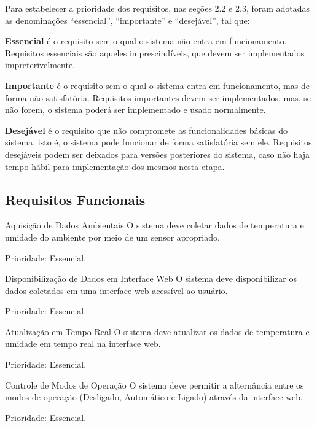 Para estabelecer a prioridade dos requisitos, nas seções 2.2 e 2.3, foram adotadas as
denominações “essencial”, “importante” e “desejável”, tal que:

\textbf{Essencial} é o requisito sem o qual o sistema não entra em funcionamento. Requisitos
essenciais são aqueles imprescindíveis, que devem ser implementados impreterivelmente.

\textbf{Importante} é o requisito sem o qual o sistema entra em funcionamento, mas de forma não
satisfatória. Requisitos importantes devem ser implementados, mas, se não forem, o sistema
poderá ser implementado e usado normalmente.

\textbf{Desejável} é o requisito que não compromete as funcionalidades básicas do sistema, isto é,
o sistema pode funcionar de forma satisfatória sem ele. Requisitos desejáveis podem ser deixados
para versões posteriores do sistema, caso não haja tempo hábil para implementação dos mesmos
nesta etapa.

\subsection{Requisitos Funcionais}

\begin{rfreq}{Aquisição de Dados Ambientais}
O sistema deve coletar dados de temperatura e umidade do ambiente por meio de um sensor apropriado.

Prioridade:  Essencial.
\end{rfreq}

\begin{rfreq}{Disponibilização de Dados em Interface Web}
O sistema deve disponibilizar os dados coletados em uma interface web acessível ao usuário.

Prioridade:  Essencial.
\end{rfreq}

\begin{rfreq}{Atualização em Tempo Real}
O sistema deve atualizar os dados de temperatura e umidade em tempo real na interface web.

Prioridade:  Essencial.
\end{rfreq}

\begin{rfreq}{Controle de Modos de Operação}
O sistema deve permitir a alternância entre os modos de operação (Desligado, Automático e Ligado) através da interface web.

Prioridade:  Essencial.
\end{rfreq}

